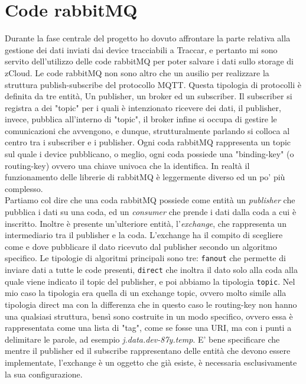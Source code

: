 \documentclass[a4paper,titlepage,12pt]{book}
\begin{document}
{\section{
Code rabbitMQ}
Durante la fase centrale del progetto ho dovuto affrontare la parte relativa alla gestione dei dati inviati dai device tracciabili a Traccar, e pertanto mi sono servito dell'utilizzo delle code rabbitMQ per poter salvare i dati sullo storage di zCloud.
Le code rabbitMQ non sono altro che un ausilio per realizzare la struttura publish-subscribe del protocollo MQTT. Questa tipologia di protocolli è definita da tre entità, Un publisher, un broker ed un subscriber. Il subscriber si registra a dei "topic" per i quali è intenzionato ricevere dei dati, il publisher, invece, pubblica all'interno di "topic", il broker infine si occupa di gestire le comunicazioni che avvengono, e dunque, strutturalmente parlando si colloca al centro tra i subscriber e i publisher. Ogni coda rabbitMQ rappresenta un topic sul quale i device pubblicano, o meglio, ogni coda possiede una "binding-key" (o routing-key) ovvero una chiave univoca che la identifica.
In realtà il funzionamento delle librerie di rabbitMQ è leggermente diverso ed un po' più complesso.\\
Partiamo col dire che una coda rabbitMQ possiede come entità un \textit{publisher} che pubblica i dati su una coda, ed un \textit{consumer} che prende i dati dalla coda a cui è inscritto. Inoltre è presente un'ulteriore entità, l'\textit{exchange}, che rappresenta un intermediario tra il publisher e la coda. L'exchange ha il compito di scegliere come e dove pubblicare il dato ricevuto dal publisher secondo un algoritmo specifico. Le tipologie di algoritmi principali sono tre: \texttt{fanout} che permette di inviare dati a tutte le code presenti, \texttt{direct} che inoltra il dato solo alla coda alla quale viene indicato il topic del publisher, e poi abbiamo la tipologia \texttt{topic}. Nel mio caso la tipologia era quella di un exchange topic, ovvero molto simile alla tipologia direct ma con la differenza che in questo caso le routing-key non hanno una qualsiasi struttura, bensì sono costruite in un modo specifico, ovvero essa è rappresentata come una lista di "tag", come se fosse una URI, ma con i punti a delimitare le parole, ad esempio \textit{j.data.dev-87y.temp}.
E' bene specificare che mentre il publisher ed il subscribe rappresentano delle entità che devono essere implementate, l'exchange è un oggetto che già esiste, è necessaria esclusivamente la sua configurazione.\\
}
\end{document}
